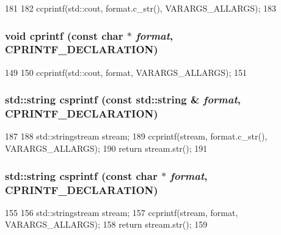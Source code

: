 \begin{DoxyCode}
181 {
182     ccprintf(std::cout, format.c_str(), VARARGS_ALLARGS);
183 }
\end{DoxyCode}
\hypertarget{cprintf_8hh_a46231f0e413d30a2560384d0ae05536b}{
\subsubsection[{cprintf}]{\setlength{\rightskip}{0pt plus 5cm}void cprintf (const char $\ast$ {\em format}, \/  CPRINTF\_\-DECLARATION)}}
\label{cprintf_8hh_a46231f0e413d30a2560384d0ae05536b}



\begin{DoxyCode}
149 {
150     ccprintf(std::cout, format, VARARGS_ALLARGS);
151 }
\end{DoxyCode}
\hypertarget{cprintf_8hh_a2e89c0bfb307958ab6e3f1cd2cde8983}{
\subsubsection[{csprintf}]{\setlength{\rightskip}{0pt plus 5cm}std::string csprintf (const std::string \& {\em format}, \/  CPRINTF\_\-DECLARATION)}}
\label{cprintf_8hh_a2e89c0bfb307958ab6e3f1cd2cde8983}



\begin{DoxyCode}
187 {
188     std::stringstream stream;
189     ccprintf(stream, format.c_str(), VARARGS_ALLARGS);
190     return stream.str();
191 }
\end{DoxyCode}
\hypertarget{cprintf_8hh_ace22d1c39f2df58e593bc49d1613eca2}{
\subsubsection[{csprintf}]{\setlength{\rightskip}{0pt plus 5cm}std::string csprintf (const char $\ast$ {\em format}, \/  CPRINTF\_\-DECLARATION)}}
\label{cprintf_8hh_ace22d1c39f2df58e593bc49d1613eca2}



\begin{DoxyCode}
155 {
156     std::stringstream stream;
157     ccprintf(stream, format, VARARGS_ALLARGS);
158     return stream.str();
159 }
\end{DoxyCode}
